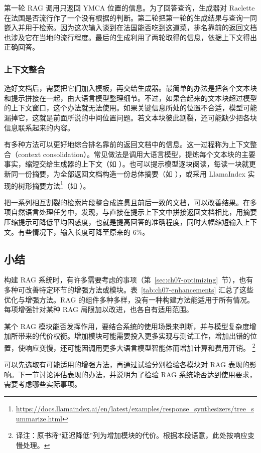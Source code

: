 第一轮 RAG 调用只返回 YMCA 位置的信息。为了回答查询，生成器对 Raclette 在法国是否流行作了一个没有根据的判断。第二轮把第一轮的生成结果与查询一同嵌入并用于检索。因为这次输入谈到在法国能否吃到这道菜，排名靠前的返回文档也涉及它在当地的流行程度。最后的生成利用了两轮取得的信息，依据上下文得出正确回答。

\subsubsection{上下文整合}
\label{sec:ch07-consolidation}
选好文档后，需要把它们加入模板，再交给生成器。最简单的办法是把各个文本块和提示拼接在一起，由大语言模型整理细节。不过，如果合起来的文本块超过模型的上下文窗口，这个办法就无法使用。如果关键信息所处的位置不合适，模型可能漏掉它，这就是前面所说的中间位置问题。若文本块彼此割裂，还可能缺少把各块信息联系起来的内容。

有多种方法可以更好地综合排名靠前的返回文档中的信息。这一过程称为上下文整合（context consolidation）。常见做法是调用大语言模型，提炼每个文本块的主要事实，缩短交给生成器的上下文（如 ）。也可以提示模型逐块阅读，每读一块就更新同一份摘要，为全部返回文档构造一份总体摘要（如 ），或采用 LlamaIndex 实现的树形摘要方法\footnote{\url{https://docs.llamaindex.ai/en/latest/examples/response_synthesizers/tree_summarize.html}}（如 ）。

把一系列相互割裂的检索片段整合成连贯且前后一致的文档，可以改善结果。在多项自然语言处理任务中，发现，与直接在提示上下文中拼接返回文档相比，用摘要压缩提示可降低平均困惑度，也就是提高回答的准确程度，同时大幅缩短输入上下文。有些情况下，输入长度可降至原来的 6\%。




\subsection{小结}
构建 RAG 系统时，有许多需要考虑的事项（第~\ref{sec:ch07-optimizing}~节），也有多种可改善特定环节的增强方法或模块。表~\ref{tab:ch07-enhancements} 汇总了这些优化与增强方法。RAG 的组件多种多样，没有一种构建方法能适用于所有情况。每项增强针对某种 RAG 局限加以改进，也各自有适用范围。

\begin{keypoint}
某个 RAG 模块能否发挥作用，要结合系统的使用场景来判断，并与模型复杂度增加所带来的代价权衡。增加模块可能需要投入更多实现与测试工作，增加出错的位置，使响应变慢，还可能因调用更多大语言模型智能体而增加计算和费用开销。%
\footnote{译注：原书将“延迟降低”列为增加模块的代价。根据本段语意，此处按响应变慢处理。}

可以先选取有可能适用的增强方法，再通过试验分别检验各模块对 RAG 表现的影响。下一节讨论评估表现的办法，并说明为了检验 RAG 系统能否达到使用要求，需要考虑哪些实际事项。
\end{keypoint}

